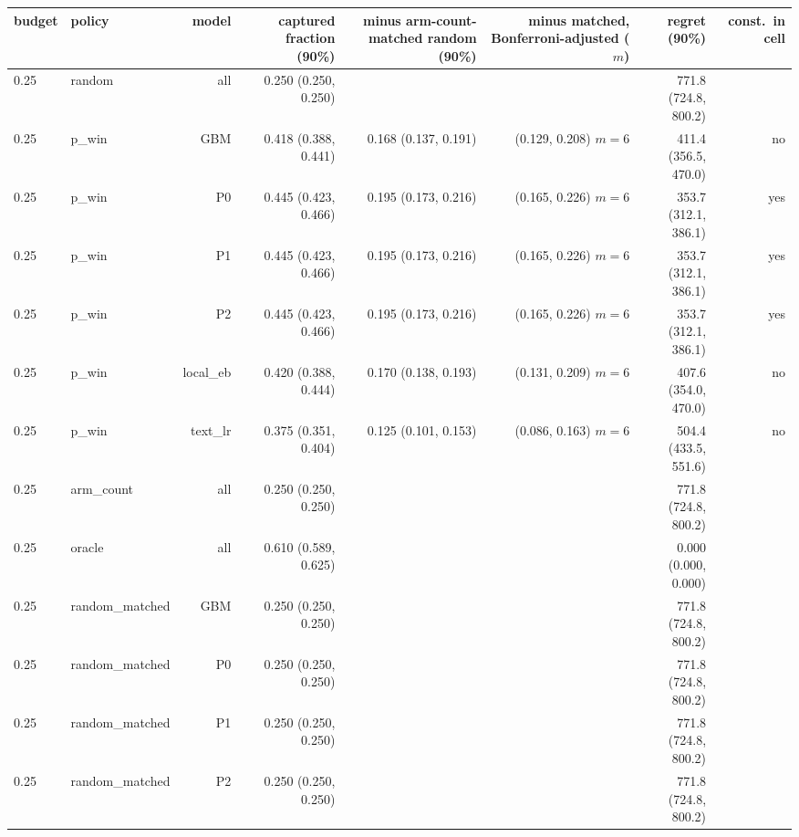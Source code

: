 \begin{tabular}{llrrrrrr}
\toprule
budget & policy & model & captured fraction (90\%) & minus arm-count-matched random (90\%) & minus matched, Bonferroni-adjusted ($m$) & regret (90\%) & const.\ in cell \\
\midrule
0.25 & random & all & 0.250 (0.250, 0.250) &  &  & 771.8 (724.8, 800.2) &  \\
0.25 & p\_win & GBM & 0.418 (0.388, 0.441) & 0.168 (0.137, 0.191) & (0.129, 0.208) $m=6$ & 411.4 (356.5, 470.0) & no \\
0.25 & p\_win & P0 & 0.445 (0.423, 0.466) & 0.195 (0.173, 0.216) & (0.165, 0.226) $m=6$ & 353.7 (312.1, 386.1) & yes \\
0.25 & p\_win & P1 & 0.445 (0.423, 0.466) & 0.195 (0.173, 0.216) & (0.165, 0.226) $m=6$ & 353.7 (312.1, 386.1) & yes \\
0.25 & p\_win & P2 & 0.445 (0.423, 0.466) & 0.195 (0.173, 0.216) & (0.165, 0.226) $m=6$ & 353.7 (312.1, 386.1) & yes \\
0.25 & p\_win & local\_eb & 0.420 (0.388, 0.444) & 0.170 (0.138, 0.193) & (0.131, 0.209) $m=6$ & 407.6 (354.0, 470.0) & no \\
0.25 & p\_win & text\_lr & 0.375 (0.351, 0.404) & 0.125 (0.101, 0.153) & (0.086, 0.163) $m=6$ & 504.4 (433.5, 551.6) & no \\
0.25 & arm\_count & all & 0.250 (0.250, 0.250) &  &  & 771.8 (724.8, 800.2) &  \\
0.25 & oracle & all & 0.610 (0.589, 0.625) &  &  & 0.000 (0.000, 0.000) &  \\
0.25 & random\_matched & GBM & 0.250 (0.250, 0.250) &  &  & 771.8 (724.8, 800.2) &  \\
0.25 & random\_matched & P0 & 0.250 (0.250, 0.250) &  &  & 771.8 (724.8, 800.2) &  \\
0.25 & random\_matched & P1 & 0.250 (0.250, 0.250) &  &  & 771.8 (724.8, 800.2) &  \\
0.25 & random\_matched & P2 & 0.250 (0.250, 0.250) &  &  & 771.8 (724.8, 800.2) &  \\

\end{tabular}
